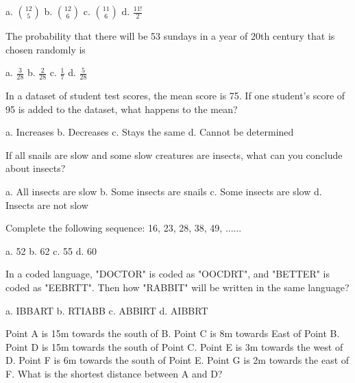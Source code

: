 \documentclass[a4paper, addpoints]{exam}
\begin{document}
\begin{questions}
	\begin{oneparcheckboxes}
		\choice a. \(\binom{12}{5}\)
		\choice b. \(\binom{12}{6}\)
		\choice c. \(\binom{11}{6}\)
		\choice d. \(\frac{11!}{2}\)
	\end{oneparcheckboxes}
	\question The probability that there will be 53 sundays in a year of 20th century that is chosen randomly is\\
	
	\begin{oneparcheckboxes}
		\choice a. \(\frac{3}{28}\)
		\choice b. \(\frac{2}{28}\)
		\choice c. \(\frac{1}{7}\)
		\choice d. \(\frac{5}{28}\)
	\end{oneparcheckboxes}
	\question In a dataset of student test scores, the mean score is 75. If one student's score of 95 is added to the dataset, what happens to the mean?\\
	
	\begin{oneparcheckboxes}
		\choice a. Increases
		\choice b. Decreases
		\choice c. Stays the same
		\choice d. Cannot be determined
	\end{oneparcheckboxes}
	\question If all snails are slow and some slow creatures are insects, what can you conclude about insects?\\
	
	\begin{oneparcheckboxes}
		\choice a. All insects are slow
		\choice b. Some insects are snails
		\choice c. Some insects are slow
		\choice d. Insects are not slow
	\end{oneparcheckboxes}
	\question Complete the following sequence: 16, 23, 28, 38, 49, ...... \\
	
	\begin{oneparcheckboxes}
		\choice a. 52
		\choice b. 62
		\choice c. 55
		\choice d. 60
	\end{oneparcheckboxes}
	\question In a coded language, "DOCTOR" is coded as "OOCDRT", and "BETTER" is coded as "EEBRTT". Then how "RABBIT" will be written in the same language?\\
	
	\begin{oneparcheckboxes}
		\choice a. IBBART
		\choice b. RTIABB
		\choice c. ABBIRT
		\choice d. AIBBRT
	\end{oneparcheckboxes}
	\question Point A is 15m towards the south of B. Point C is 8m towards East of Point B. Point D is 15m towards the south of Point C. Point E is 3m towards the west of D. Point F is 6m towards the south of Point E. Point G is 2m towards the east of F. What is the shortest distance between A and D?\\
	

\end{questions}
\end{document}

